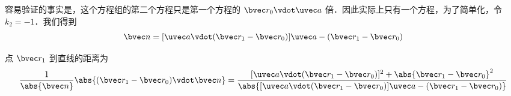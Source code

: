容易验证的事实是，这个方程组的第二个方程只是第一个方程的 $\bvec r_0\vdot\uvec a$ 倍．因此实际上只有一个方程，为了简单化，令 $k_2 = -1$．我们得到
\begin{equation}
\bvec n = [\uvec a \vdot (\bvec r_1 -\bvec r_0)]\uvec a - (\bvec r_1 - \bvec r_0)
\end{equation}

点 $\bvec r_1$ 到直线的距离为
\begin{equation}
\frac{1}{\abs{\bvec n}}\abs{(\bvec r_1 - \bvec r_0) \vdot \bvec n}=\frac{[\uvec a \vdot (\bvec r_1 - \bvec r_0)]^2+\abs{\bvec r_1 - \bvec r_0}^2}{\abs{[\uvec a \vdot (\bvec r_1 - \bvec r_0)]\uvec a - (\bvec r_1 - \bvec r_0)}}
\end{equation}

